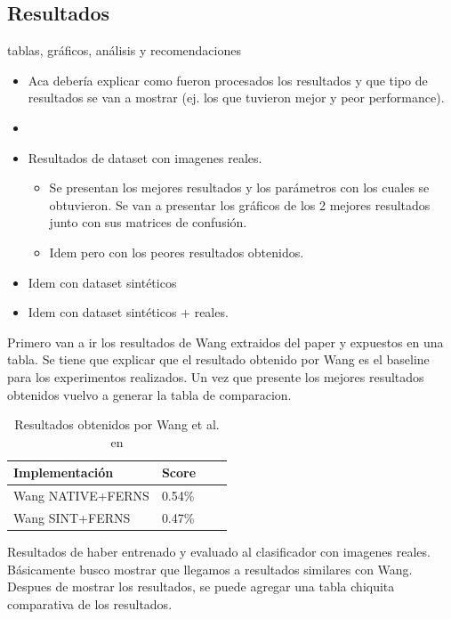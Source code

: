 \newpage
\subsection{Resultados}
\label{subsection:resultados}
	tablas, gráficos, análisis y recomendaciones
	\begin{itemize}
		\item Aca debería explicar como fueron procesados los
                  resultados y que tipo de resultados se van a mostrar (ej. los
                  que tuvieron mejor y peor performance). 
                \item {}
		\item Resultados de dataset con imagenes reales.
		\begin{itemize}
			\item Se presentan los mejores resultados y los parámetros con los cuales se obtuvieron. Se van a presentar los gráficos de los 2 mejores resultados junto con sus matrices de confusión.
			\item Idem pero con los peores resultados obtenidos.
		\end{itemize}
		\item Idem con dataset sintéticos
		\item Idem con dataset sintéticos + reales.

	\end{itemize}
	
	Primero van a ir los resultados de Wang extraidos del paper y expuestos en una tabla. Se tiene que explicar que el resultado obtenido por Wang es el baseline para los experimentos realizados. Un vez que presente los mejores resultados obtenidos vuelvo a generar la tabla de comparacion.
	
	\begin{table}
		\centering
	    \begin{tabular}{ | l | l | l | p{5cm} |}
    			\hline
    				\textbf{Implementación} & \textbf{Score} \\ \hline
    				Wang NATIVE+FERNS & 0.54\% \\ \hline
    				Wang SINT+FERNS & 0.47\% \\
    			\hline
    		\end{tabular}	
    		\caption{Resultados obtenidos por Wang et al. en \cite{wang}}
	\end{table}

	Resultados de haber entrenado y evaluado al clasificador con imagenes reales. Básicamente busco mostrar que llegamos a resultados similares con Wang. Despues de mostrar los resultados, se puede agregar una tabla chiquita comparativa de los resultados.
	
